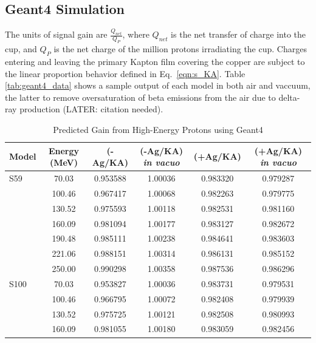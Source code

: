 \documentclass{mc2015}
\begin{document}
\subsection{Geant4 Simulation}

The units of signal gain are $\frac{Q_{net}}{Q_P}$, where $Q_{net}$ is the net transfer of charge into the cup, and $Q_P$ is the net charge of the million protons irradiating the cup.  Charges entering and leaving the primary Kapton film covering the copper are subject to the linear proportion behavior defined in Eq.~\ref{eqn:s_KA}.  Table \ref{tab:geant4_data} shows a sample output of each model in both air and vaccuum, the latter to remove oversaturation of beta emissions from the air due to delta-ray production (LATER: citation needed).

\begin{table}[H]
  \centering
  \caption{Predicted Gain from High-Energy Protons using Geant4}
  \begin{tabular}{lccccc}
    \toprule
    Model & Energy (MeV) & (-Ag/KA) & (-Ag/KA) \emph{in vacuo} & (+Ag/KA) & (+Ag/KA) \emph{in vacuo} \\
    \midrule
    S59 & 70.03  & \num{0.953588} & \num{1.00036} & \num{0.983320} & \num{0.979287} \\
        & 100.46 & \num{0.967417} & \num{1.00068} & \num{0.982263} & \num{0.979775} \\
        & 130.52 & \num{0.975593} & \num{1.00118} & \num{0.982531} & \num{0.981160} \\
        & 160.09 & \num{0.981094} & \num{1.00177} & \num{0.983127} & \num{0.982672} \\
        & 190.48 & \num{0.985111} & \num{1.00238} & \num{0.984641} & \num{0.983603} \\
        & 221.06 & \num{0.988151} & \num{1.00314} & \num{0.986131} & \num{0.985152} \\
        & 250.00 & \num{0.990298} & \num{1.00358} & \num{0.987536} & \num{0.986296} \\
    \midrule
    S100 & 70.03 & \num{0.953827} & \num{1.00036} & \num{0.983731} & \num{0.979531} \\
        & 100.46 & \num{0.966795} & \num{1.00072} & \num{0.982408} & \num{0.979939} \\
        & 130.52 & \num{0.975725} & \num{1.00121} & \num{0.982508} & \num{0.980993} \\
        & 160.09 & \num{0.981055} & \num{1.00180} & \num{0.983059} & \num{0.982456} \\

\end{tabular}
\end{table}
\end{document}
